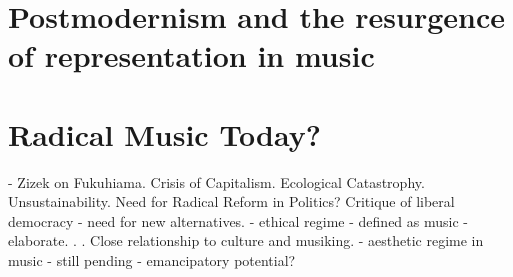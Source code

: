 \section{Postmodernism and the resurgence of representation in music}

\section{Radical Music Today?}

- Zizek on Fukuhiama. Crisis of Capitalism. Ecological Catastrophy. Unsustainability. Need for Radical Reform in Politics? Critique of liberal democracy - need for new alternatives.
- ethical regime - defined as music - elaborate. . . Close relationship to culture and musiking.
- aesthetic regime in music - still pending - emancipatory potential?


\label{ch:introduction}